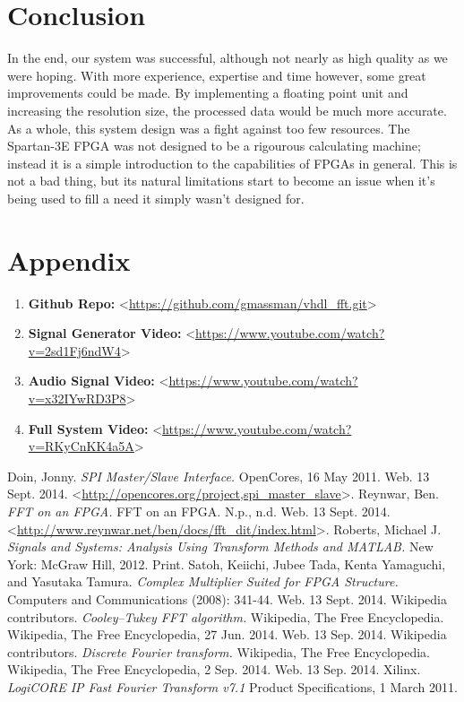 \documentclass[12pt]{article}
\begin{document}
  \section*{Conclusion}
    In the end, our system was successful, although not nearly as high quality as we were hoping.
    With more experience, expertise and time however, some great improvements could be made.
    By implementing a floating point unit and increasing the resolution size, the processed data would be much more accurate.
    As a whole, this system design was a fight against too few resources. 
    The Spartan-3E FPGA was not designed to be a rigourous calculating machine; instead it is a simple introduction to the capabilities of FPGAs in general.
    This is not a bad thing, but its natural limitations start to become an issue when it's being used to fill a need it simply wasn't designed for.

  \clearpage
  \section*{Appendix}
    \begin{enumerate}
        \item \textbf{Github Repo:} \textless\url{https://github.com/gmassman/vhdl_fft.git}\textgreater
        \item \textbf{Signal Generator Video:} \textless\url{https://www.youtube.com/watch?v=2sd1Fj6ndW4}\textgreater
        \item \textbf{Audio Signal Video:} \textless\url{https://www.youtube.com/watch?v=x32IYwRD3P8}\textgreater
        \item \textbf{Full System Video:} \textless\url{https://www.youtube.com/watch?v=RKyCnKK4a5A}\textgreater
    \end{enumerate}

  \clearpage
  \begin{thebibliography}{9}
      Doin, Jonny. \emph{SPI Master/Slave Interface.} OpenCores, 16 May 2011. Web. 13 Sept. 2014. \textless\url{http://opencores.org/project,spi_master_slave}\textgreater.
      Reynwar, Ben. \emph{FFT on an FPGA.} FFT on an FPGA. N.p., n.d. Web. 13 Sept. 2014. \textless\url{http://www.reynwar.net/ben/docs/fft_dit/index.html}\textgreater.
      Roberts, Michael J. \emph{Signals and Systems: Analysis Using Transform Methods and MATLAB.} New York: McGraw Hill, 2012. Print.
      Satoh, Keiichi, Jubee Tada, Kenta Yamaguchi, and Yasutaka Tamura. \emph{Complex Multiplier Suited for FPGA Structure.} Computers and Communications (2008): 341-44. Web. 13 Sept. 2014.
      Wikipedia contributors. \emph{Cooley–Tukey FFT algorithm.} Wikipedia, The Free Encyclopedia. Wikipedia, The Free Encyclopedia, 27 Jun. 2014. Web. 13 Sep. 2014.
      Wikipedia contributors. \emph{Discrete Fourier transform.} Wikipedia, The Free Encyclopedia. Wikipedia, The Free Encyclopedia, 2 Sep. 2014. Web. 13 Sep. 2014.
      Xilinx. \emph{LogiCORE IP Fast Fourier Transform v7.1} Product Specifications, 1 March 2011. 
  \end{thebibliography}
\end{document}
